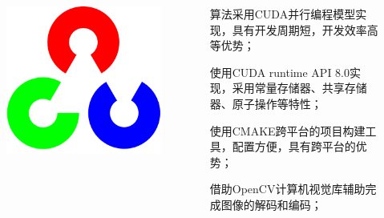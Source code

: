 \documentclass[aspectratio=43, xcolor=svgnames, t, 10pt]{beamer}
\begin{document}
\begin{frame}
\begin{columns}
\begin{column}{0.2\linewidth}
\begin{figure}
\begin{minipage}[b]{\linewidth}
        \end{minipage}
        \begin{minipage}[b]{\linewidth}
          \includegraphics[width=\linewidth]{./figure/opencv-logo2.png}
        \end{minipage}
      \end{figure}
    \end{column}
    \begin{column}{0.8\textwidth}
      \onslide<+->
      {
      \begin{block}{}
        算法采用\textrm{CUDA}并行编程模型实现，具有开发周期短，开发效率高等优势；
      \end{block}
      }
      \onslide<+->
      {
      \begin{block}{}
        使用\textrm{CUDA runtime API 8.0}实现，采用常量存储器、共享存储器、原子操作等特性；
      \end{block}
      }
      \onslide<+->
      {
      \begin{block}{}
        使用\textrm{CMAKE}跨平台的项目构建工具，配置方便，具有跨平台的优势；
      \end{block}
      }
      \onslide<+->
      {
      \begin{block}{}
        借助\textrm{OpenCV}计算机视觉库辅助完成图像的解码和编码；
      \end{block}
      }
    \end{column}
\end{columns}
\end{frame}
\end{document}
